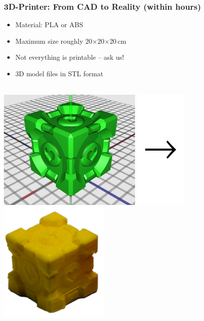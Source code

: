\documentclass[t]{beamer}
\begin{document}
\begin{frame}
    \frametitle{3D-Printer: From CAD to Reality (within hours)}
    \begin{itemize}
        \item Material: PLA or ABS
        \item Maximum size roughly 20$\times$20$\times$20\,cm
        \item Not everything is printable -- ask us!
        \item 3D model files in STL format
    \end{itemize}
    \begin{center}
    ~\\
        \includegraphics[height=6cm]{../img/companioncube_render.png}
        \includegraphics[height=6cm]{../img/pfeil.pdf}
        \includegraphics[height=6cm]{../img/companioncube.png}
    \end{center}
\end{frame}
\end{document}
